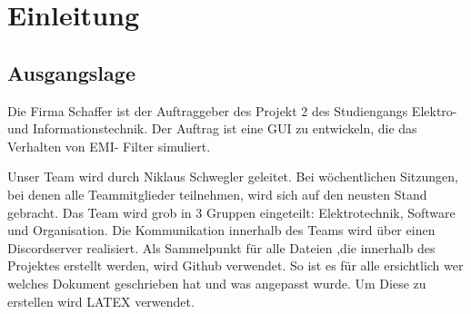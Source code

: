 \section{Einleitung}
\subsection{Ausgangslage}

Die Firma Schaffer ist der Auftraggeber des Projekt 2 des Studiengangs Elektro- und Informationstechnik. Der Auftrag ist eine GUI zu entwickeln, die das Verhalten von EMI- Filter simuliert. 
 
Unser Team wird durch Niklaus Schwegler geleitet. 
Bei wöchentlichen Sitzungen, bei denen alle Teammitglieder teilnehmen, wird sich auf den neusten Stand gebracht. Das Team wird grob in 3 Gruppen eingeteilt: Elektrotechnik, Software und Organisation. Die Kommunikation innerhalb des Teams wird über einen Discordserver realisiert.  Als Sammelpunkt für alle Dateien ,die innerhalb des Projektes erstellt werden, wird Github verwendet. So ist es für alle ersichtlich wer welches Dokument geschrieben hat und was angepasst wurde. Um Diese zu erstellen wird LATEX verwendet. 

    







